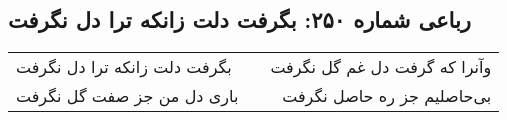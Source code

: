 \begin{center}
\section*{رباعی شماره ۲۵۰: بگرفت دلت زانکه ترا دل نگرفت}
\label{sec:0250}
\begin{longtable}{l p{0.5cm} r}
بگرفت دلت زانکه ترا دل نگرفت
&&
وآنرا که گرفت دل غم گل نگرفت
\\
باری دل من جز صفت گل نگرفت
&&
بی‌حاصلیم جز ره حاصل نگرفت
\\
\end{longtable}
\end{center}
